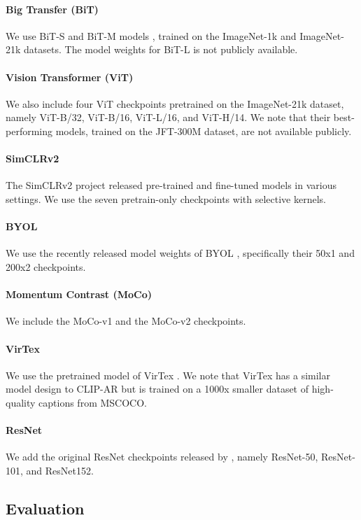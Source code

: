 \documentclass{article}
\begin{document}
\paragraph{Big Transfer (BiT)} We use BiT-S and BiT-M models \citep{kolesnikov2019large}, trained on the ImageNet-1k and ImageNet-21k datasets. The model weights for BiT-L is not publicly available.
\paragraph{Vision Transformer (ViT)} We also include four ViT \cite{dosovitskiy2020image} checkpoints pretrained on the ImageNet-21k dataset, namely ViT-B/32, ViT-B/16, ViT-L/16, and ViT-H/14. We note that their best-performing models, trained on the JFT-300M dataset, are not available publicly.
\paragraph{SimCLRv2} The SimCLRv2 \citep{chen2020big} project released pre-trained and fine-tuned models in various settings. We use the seven pretrain-only checkpoints with selective kernels.
\paragraph{BYOL} We use the recently released model weights of BYOL \citep{grill2020byol}, specifically their 50x1 and 200x2 checkpoints.
\paragraph{Momentum Contrast (MoCo)} We include the MoCo-v1 \citep{he2020moco} and the MoCo-v2 \cite{chen2020mocov2} checkpoints.
\paragraph{VirTex} We use the pretrained model of VirTex \citep{desai2020virtex}. We note that VirTex has a similar model design to CLIP-AR but is trained on a 1000x smaller dataset of high-quality captions from MSCOCO.
\paragraph{ResNet} We add the original ResNet checkpoints released by \cite{he2016resnet}, namely ResNet-50, ResNet-101, and ResNet152.


\subsection{Evaluation}
\end{document}
